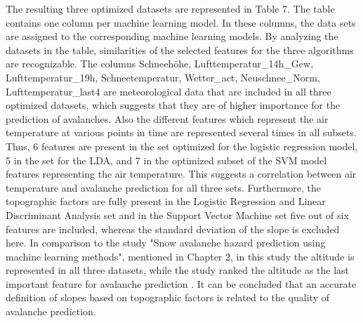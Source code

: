 \documentclass[../masterarbeit.tex]{subfiles}
\begin{document}
The resulting three optimized datasets are represented in Table 7. The table contains one column per machine learning model. In these columns, the data sets are assigned to the corresponding machine learning models. By analyzing the datasets in the table, similarities of the selected features for the three algorithms are recognizable. The columns Schneehöhe, Lufttemperatur\_14h\_Gew, Lufttemperatur\_19h, Schneetemperatur, Wetter\_act, Neuschnee\_Norm, Lufttemperatur\_last4 are meteorological data that are included in all three optimized datasets, which suggests that they are of higher importance for the prediction of avalanches. Also the different features which represent the air temperature at various points in time are represented several times in all subsets. Thus, 6 features are present in the set optimized for the logistic regression model, 5 in the set for the LDA, and 7 in the optimized subset of the SVM model features representing the air temperature. This suggests a correlation between air temperature and avalanche prediction for all three sets. 
Furthermore, the topographic factors are fully present in the Logistic Regression and Linear Discriminant Analysis set and in the Support Vector Machine set five out of six features are included, whereas the standard deviation of the slope is excluded here. 
In comparison to the study "Snow avalanche hazard prediction using machine learning methods", mentioned in Chapter 2, in this study the altitude is represented in all three datasets, while the study ranked the altitude as the last important feature for avalanche prediction \textcite[]{Bahram:2019}.
It can be concluded that an accurate definition of slopes based on topographic factors is related to the quality of avalanche prediction.
\end{document}
